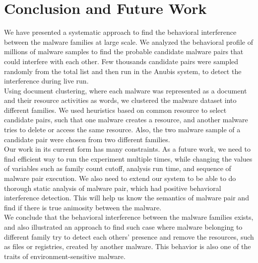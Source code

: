\chapter{Conclusion and Future Work}\label{chapter:conclusion_and_future_work}
We have presented a systematic approach to find the behavioral interference between the malware families at large scale.
We analyzed the behavioral profile of millions of malware samples to find the probable candidate malware pairs that could interfere with each other.
Few thousands candidate pairs were sampled randomly from the total list and then run in the Anubis system, to detect the interference during live run.\\

Using document clustering, where each malware was represented as a document and their resource activities as words, we clustered the malware dataset into different families.
We used heuristics based on common resource to select candidate pairs, such that one malware creates a resource, and another malware tries to delete or access the same resource.
Also, the two malware sample of a candidate pair were chosen from two different families.
\\

Our work in its current form has many constraints.
As a future work, we need to find efficient way to run the experiment multiple times, while changing the values of variables such as family count cutoff, analysis run time, and sequence of malware pair execution.
We also need to extend our system to be able to do thorough static analysis of malware pair, which had positive behavioral interference detection.
This will help us know the semantics of malware pair and find if there is true animosity between the malware.
\\

We conclude that the behavioral interference between the malware families exists, and also illustrated an approach to find such case where malware belonging to different family try to detect each others' presence and remove the resources, such as files or registries, created by another malware.
This behavior is also one of the traits of environment-sensitive malware.
